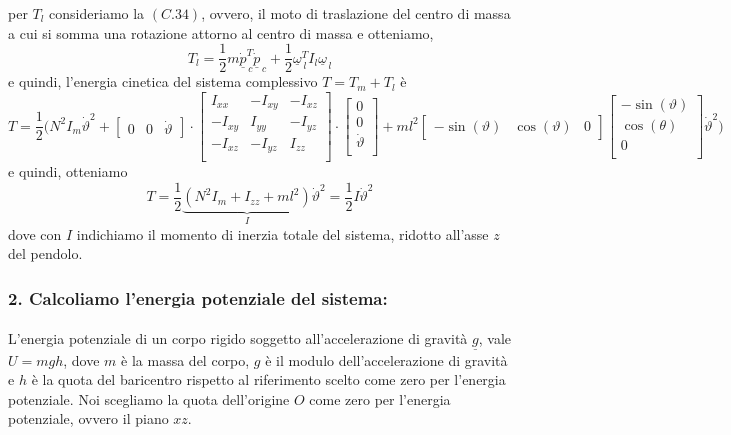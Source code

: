 per $T_l$ consideriamo la $(C.34)$, ovvero, il moto di traslazione del centro di massa a cui si somma una rotazione attorno al centro di massa e otteniamo,
\begin{equation}
	T_l = \frac{1}{2} m \dot{\underline{p}}_{\,c}^T \dot{\underline{p}}_{\,c} + \frac{1}{2} \underline{\omega}_{\,l}^T I_l \underline{\omega}_{\,l}
\end{equation}
e quindi, l'energia cinetica del sistema complessivo $T = T_m + T_l$ è
\begin{equation*}
	T = \frac{1}{2} \Biggl( N^2 I_m \dot{\vartheta}^2 + 
	\begin{bmatrix}
		0 & 0 & \dot{\vartheta}
	\end{bmatrix}
	\cdot
	\begin{bmatrix}
		I_{xx} & -I_{xy} & -I_{xz} \\
		-I_{xy} & I_{yy} & -I_{yz} \\
		-I_{xz} & -I_{yz} & I_{zz} \\
	\end{bmatrix}
	\cdot
	\begin{bmatrix}
		0 \\
		0 \\
		\dot{\vartheta} \\
	\end{bmatrix}
	+ m l^2
	\begin{bmatrix}
		-\sin(\vartheta) & 
		\cos(\vartheta) &
		0
	\end{bmatrix}
	\begin{bmatrix}
		- \sin(\vartheta) \\
		\cos(\theta) \\
		0 \\
	\end{bmatrix}
	\dot{\vartheta}^2
	\Biggr)
\end{equation*}
e quindi, otteniamo
\begin{equation}
	T = \frac{1}{2}\underbrace{(N^2 I_m + I_{zz} + ml^2)}_{I} \dot{\vartheta}^2 = \frac{1}{2} I \dot{\vartheta}^2
\end{equation}
dove con $I$ indichiamo il momento di inerzia totale del sistema, ridotto all'asse $z$ del pendolo.
\subsubsection{2. Calcoliamo l'energia potenziale del sistema:}
\paragraph{}
L'energia potenziale di un corpo rigido soggetto all'accelerazione di gravità $\underline{g}$, vale $U = mgh$, dove $m$ è la massa del corpo, $g$ è il modulo dell'accelerazione di gravità e $h$ è la quota del baricentro rispetto al riferimento scelto come zero per l'energia potenziale. Noi scegliamo la quota dell'origine $O$ come zero per l'energia potenziale, ovvero il piano $xz$.


